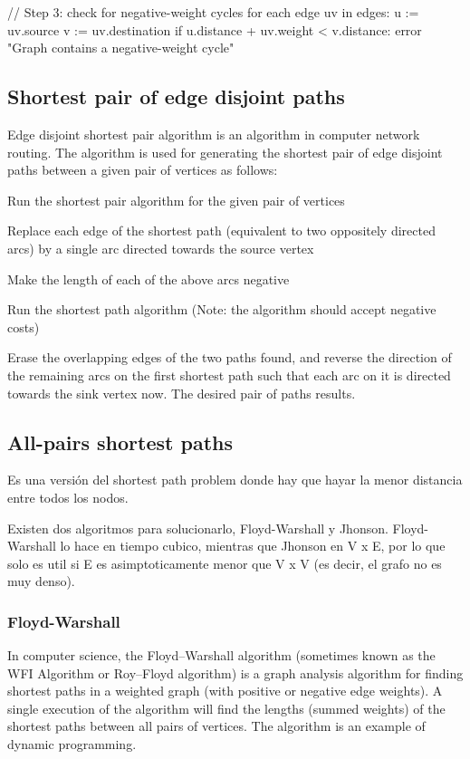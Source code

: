 \documentclass[10pt,letterpaper,twocolumn,twosided]{article}
\begin{document}
   // Step 3: check for negative-weight cycles
   for each edge uv in edges:
       u := uv.source
       v := uv.destination
       if u.distance + uv.weight < v.distance:
           error "Graph contains a negative-weight cycle"


\subsection{Shortest pair of edge disjoint paths}

Edge disjoint shortest pair algorithm is an algorithm in computer network routing. The algorithm 
is used for generating the shortest pair of edge disjoint paths between a given pair of vertices as follows:

Run the shortest pair algorithm for the given pair of vertices

Replace each edge of the shortest path (equivalent to two oppositely directed arcs) by a single arc directed 
towards the source vertex

Make the length of each of the above arcs negative

Run the shortest path algorithm (Note: the algorithm should accept negative costs)

Erase the overlapping edges of the two paths found, and reverse the direction of the remaining arcs on the 
first shortest path such that each arc on it is directed towards the sink vertex now. The desired pair of 
paths results.


\subsection{All-pairs shortest paths}

Es una versión del shortest path problem donde hay que hayar la menor distancia entre todos los nodos.

Existen dos algoritmos para solucionarlo, Floyd-Warshall y Jhonson. Floyd-Warshall lo hace en tiempo cubico, 
mientras que Jhonson en V x E, por lo que solo es util si E es asimptoticamente menor que V x V (es decir,
el grafo no es muy denso).

\subsubsection{Floyd-Warshall}

In computer science, the Floyd–Warshall algorithm (sometimes known as the WFI Algorithm or Roy–Floyd algorithm)
is a graph analysis algorithm for finding shortest paths in a weighted graph (with positive or negative edge weights).
A single execution of the algorithm will find the lengths (summed weights) of the shortest paths between all pairs
of vertices. The algorithm is an example of dynamic programming. 
\end{document}
